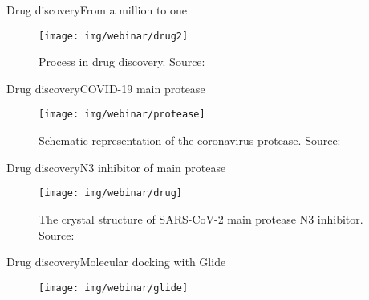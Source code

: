 \documentclass[10pt]{beamer}
\newcommand{\1}{
        	\setbeamertemplate{background}{
        		\texttt{[image: img/1]}
        		\tikz[overlay] \fill[fill opacity=0.75,fill=white] (0,0) rectangle (-\paperwidth,\paperheight);
        	}
}
\begin{document}
\begin{frame}{Drug discovery}{From a million to one}
	\begin{figure}[]
		\centering
		\texttt{[image: img/webinar/drug2]}
		\label{img:mot2}
		\caption{Process in drug discovery. Source: \cite{chanin2020}}
	\end{figure}
\end{frame}

\begin{frame}{Drug discovery}{COVID-19 main protease}
	\begin{figure}[]
		\centering
		\texttt{[image: img/webinar/protease]}
		\label{img:mot2}
		\caption{Schematic representation of the coronavirus protease. Source: \cite{zhang2020crystal}}
	\end{figure}
\end{frame}



\begin{frame}{Drug discovery}{N3 inhibitor of main protease}
	\begin{figure}[]
		\centering
		\texttt{[image: img/webinar/drug]}
		\label{img:mot2}
		\caption{The crystal structure of SARS-CoV-2 main protease N3 inhibitor. Source: \cite{jin2020structure}}
	\end{figure}
\end{frame}

\begin{frame}{Drug discovery}{Molecular docking with Glide}
	\begin{figure}[]
		\centering
		\texttt{[image: img/webinar/glide]}
		\label{img:mot2}
	\end{figure}
\end{frame}
\end{document}
